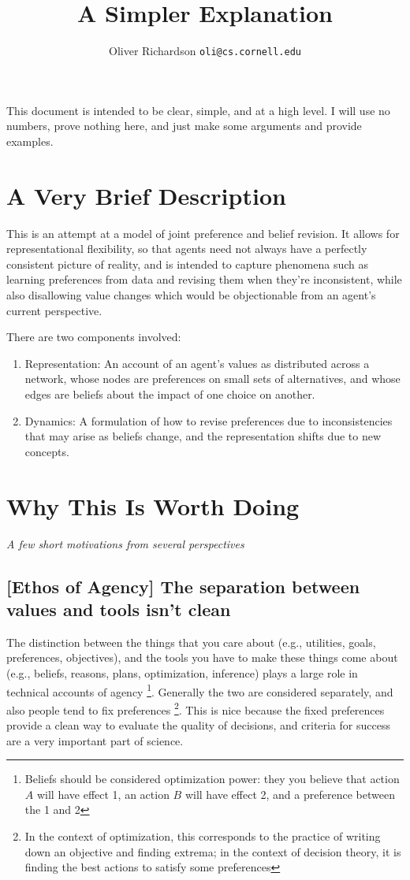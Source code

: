 \documentclass{article}
\title{A Simpler Explanation}
\author{Oliver Richardson  \texttt{oli@cs.cornell.edu}}
\begin{document}
	This document is intended to be clear, simple, and at a high level. %
	I will use no numbers, prove nothing here, and just make some arguments and provide examples.
	
	\section{A Very Brief Description}
	This is an attempt at a model of joint preference and belief revision. It allows for representational flexibility, so that agents need not always have a perfectly consistent picture of reality, and is intended to capture phenomena such as learning preferences from data and revising them when they're inconsistent, while also disallowing value changes which would be objectionable from an agent's current perspective.
	
	There are two components involved: 
	\begin{enumerate}[nosep]
		\item Representation: An account of an agent's values as distributed across a network, whose nodes are preferences on small sets of alternatives, and whose edges are beliefs about the impact of one choice on another.
		\item Dynamics: A formulation of how to revise preferences due to inconsistencies that may arise as beliefs change, and the representation shifts due to new concepts.
	\end{enumerate}
		

	\section{Why This Is Worth Doing}
	\vspace{-1em}
	\textit{A few short motivations from several perspectives}
	
	\subsection*{[Ethos of Agency] The separation between values and tools isn't clean}
	The distinction between the things that you care about (e.g., utilities, goals, preferences, objectives), and the tools you have to make these things come about (e.g., beliefs, reasons, plans, optimization, inference) plays a large role in technical accounts of agency%
	\footnote{Beliefs should be considered optimization power: they you believe that action $A$ will have effect 1, an action $B$ will have effect 2, and a preference between the 1 and 2}. Generally the two are considered separately, and also people tend to fix preferences%
	\footnote{In the context of optimization, this corresponds to the practice of writing down an objective and finding extrema; in the context of decision theory, it is finding the best actions to satisfy some preferences}. This is nice because the fixed preferences provide a clean way to evaluate the quality of decisions, and criteria for success are a very important part of science.
	
\end{document}
